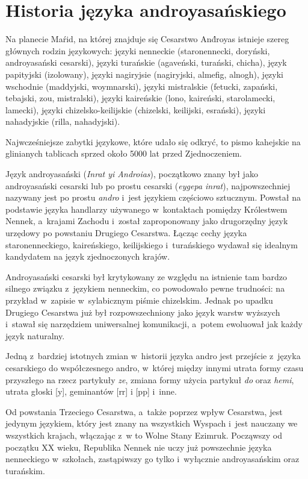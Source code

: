 \section[Historia]{Historia języka androyasańskiego}

\begin{spacing}{1.1}
Na planecie Maŕid, na której znajduje się Cesarstwo And́royas istnieje szereg 
głównych rodzin językowych: języki nenneckie (staronennecki, doryński, 
androyasański cesarski), języki turańskie (agaveński, turański, chicha), język 
papityjski (izolowany), języki nagiryjsie (nagiryjski, almefig, alnogh), 
języki wschodnie (maddyjski, woymnarski), języki mistralskie (fetucki, zapański, 
tebajski, zou, mistralski), języki kaireńskie (lono, kaireński, starolamecki, 
lamecki), języki chi\-zelsko-keilijskie (chizelski, keilijski, esrański), języki 
nahadyjskie (rilla, nahadyjski).

Najwcześniejsze zabytki językowe, które udało się odkryć, to pismo kahejskie na 
glinianych tablicach sprzed około 5000 lat przed Zjednoczeniem.

Język androyasański (\emph{Inrat yi Androias}), początkowo znany był jako 
androyasański cesarski lub po prostu cesarski (\emph{eygepa inrat}), 
najpowszechniej nazywany jest po prostu \emph{andro} i~jest językiem częściowo 
sztucznym. Powstał na podstawie języka handlarzy używanego w~kontaktach pomiędzy 
Królestwem Nennek, a~krajami Zachodu i~został zaproponowany jako drugorzędny 
język urzędowy po powstaniu Drugiego Cesarstwa. Łącząc cechy języka 
staronenneckiego, kaireńskiego, keilijskiego i~turańskiego wydawał się idealnym 
kandydatem na język zjednoczonych krajów.

Androyasański cesarski był krytykowany ze względu na istnienie tam bardzo 
silnego związku z~językiem nenneckim, co powodowało pewne trudności: na przykład 
w~zapisie w~sylabicznym piśmie chizelskim. Jednak po upadku Drugiego Cesarstwa 
już był rozpowszechniony jako język warstw wyższych i~stawał się narzędziem 
uniwersalnej komunikacji, a~potem ewoluował jak każdy język naturalny.

Jedną z~bardziej istotnych zmian w~historii języka andro jest przejście z~języka
cesarskiego do współczesnego andro, w~której między innymi utrata formy czasu
przyszłego na rzecz partykuły \emph{ze}, zmiana formy użycia partykuł \emph{do}
oraz \emph{hemi}, utrata głoski [y], geminantów [rr] i [pp] i~inne.

Od powstania Trzeciego Cesarstwa, a~także poprzez wpływ Cesarstwa, jest jedynym 
językiem, który jest znany na wszystkich Wyspach i~jest nauczany we wszystkich 
krajach, włączając z~w to Wolne Stany Ezimruk. Począwszy od początku XX wieku, 
Republika Nennek nie uczy już powszechnie języka nenneckiego w~szkołach, 
zastąpiwszy go tylko i~wyłącznie androyasańskim oraz turańskim.


\end{spacing}
